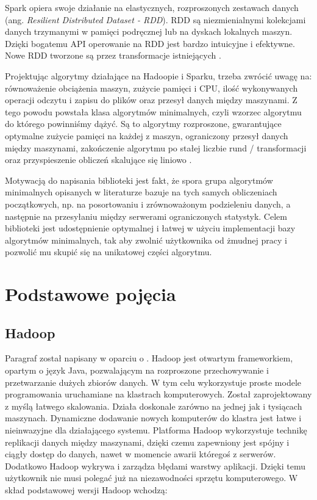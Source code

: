 \documentclass{pracamgr}
\begin{document}
Spark opiera swoje działanie na elastycznych, rozproszonych zestawach danych (ang. \textit{Resilient Distributed Dataset - RDD}). RDD są niezmienialnymi kolekcjami danych trzymanymi w pamięci podręcznej lub na dyskach lokalnych maszyn. Dzięki bogatemu API operowanie na RDD jest bardzo intuicyjne i efektywne. Nowe RDD tworzone są przez transformacje istniejących \cite{zaharia2010spark}.

Projektując algorytmy działające na Hadoopie i Sparku, trzeba zwrócić uwagę na: równoważenie obciążenia maszyn, zużycie pamięci i CPU, ilość wykonywanych operacji odczytu i zapisu do plików oraz przesył danych między maszynami. Z tego powodu powstała klasa algorytmów minimalnych, czyli wzorzec algorytmu do którego powinniśmy dążyć. Są to algorytmy rozproszone, gwarantujące optymalne zużycie pamięci na każdej z maszyn, ograniczony przesył danych między maszynami, zakończenie algorytmu po stałej liczbie rund / transformacji oraz przyspieszenie obliczeń skalujące się liniowo \cite{tao2013minimal}. 

Motywacją do napisania biblioteki jest fakt, że spora grupa algorytmów minimalnych opisanych w literaturze bazuje na tych samych obliczeniach początkowych, np. na posortowaniu i zrównoważonym podzieleniu danych, a następnie na przesyłaniu między serwerami ograniczonych statystyk. Celem biblioteki jest udostępnienie optymalnej i łatwej w użyciu implementacji bazy algorytmów minimalnych, tak aby zwolnić użytkownika od żmudnej pracy i pozwolić mu skupić się na unikatowej części algorytmu.

\chapter{Podstawowe pojęcia}\label{r:pojecia}

\section{Hadoop}
Paragraf został napisany w oparciu o \cite{shvachko2010hadoop, taylor2010overview, white2012hadoop}. Hadoop jest otwartym frameworkiem, opartym o język Java, pozwalającym na rozproszone przechowywanie i przetwarzanie dużych zbiorów danych. W tym celu wykorzystuje proste modele programowania uruchamiane na klastrach komputerowych. Został zaprojektowany z myślą łatwego skalowania. Działa doskonale zarówno na jednej jak i tysiącach maszynach. Dynamiczne dodawanie nowych komputerów do klastra jest łatwe i nieinwazyjne dla działającego systemu. Platforma Hadoop wykorzystuje technikę replikacji danych między maszynami, dzięki czemu zapewniony jest spójny i ciągły dostęp do danych, nawet w momencie awarii któregoś z serwerów. Dodatkowo Hadoop wykrywa i zarządza błędami warstwy aplikacji. Dzięki temu użytkownik nie musi polegać już na niezawodności sprzętu komputerowego. W skład podstawowej wersji Hadoop wchodzą:
\end{document}
